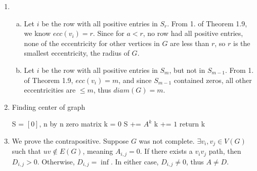 \documentclass[11pt]{article}
\begin{document}
\begin{enumerate}[1]
    \item %
        \begin{enumerate}[a)]
            \item
                Let $i$ be the row with all positive entries in $S_r$. 
                From 1. of Theorem 1.9, we know $ecc(v_i) = r$. Since for $a < r$,
                no row had all positive entries, none of the eccentricity for other
                vertices in $G$ are less than $r$, so $r$ is the smallest 
                eccentricity, the radius of $G$. 
            \item
                Let $i$ be the row with all positive entries in $S_m$, but not in
                $S_{m - 1}$. From 1. of Theorem 1.9, $ecc(v_i) = m$, and since 
                $S_{m-1}$ contained zeros, all other eccentricities are $ \leq m$,
                thus $diam(G) = m$. 
        \end{enumerate}

    \item %
        \begin{algorithm}
            \caption{Finding center of graph}
        \begin{algorithmic}[1]
            \State S = $[0]$, n by n zero matrix
            \State k = 0
            \State S += $A^k$
            \State k += $1$
            \EndWhile
            \State return k 
        \end{algorithmic}
        \end{algorithm}

    \item %
        We prove the contrapositive. Suppose $G$ was not complete. $\exists v_i,v_j 
        \in V(G)$ such that $uv \notin E(G)$, meaning $A_{i,j} = 0$. If there exists
        a $v_iv_j$ path, then $D_{i, j} > 0$. Otherwise, $D_{i, j} = \inf$. In either
        case, $D_{i, j} \neq 0$, thus $A \neq D$. 

        
\end{enumerate}
\end{document}
